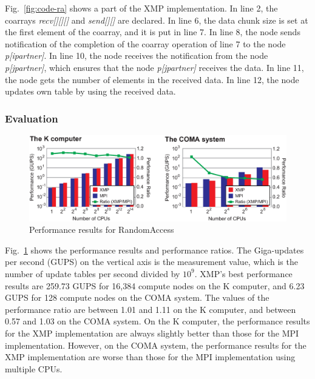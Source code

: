 \documentclass[graybox]{svmult}
\begin{document}
Fig.~\ref{fig:code-ra} shows a part of the XMP implementation.
In line 2, the coarrays {\it recv[][][]} and {\it send[][]} are declared.
In line 6, the data chunk size is set at the first element of the coarray,
and it is put in line 7.
In line 8, the node sends notification of the completion of the coarray operation of line 7 to the node {\it p[ipartner]}.
In line 10, the node receives the notification from the node {\it p[jpartner]}, which ensures that the node {\it p[jpartner]} receives the data.
In line 11, the node gets the number of elements in the received data.
In line 12, the node updates own table by using the received data.

\subsubsection{Evaluation}\label{sec:randomaccess-eva}
\begin{figure}[h]
\sidecaption
\includegraphics[scale=0.4,clip]{img/result-ra.eps}
\caption{Performance results for RandomAccess\cite{hpca}}\label{fig:result-ra}
\end{figure}

Fig.~\ref{fig:result-ra} shows the performance results and performance ratios.
The Giga-updates per second (GUPS) on the vertical axis is the measurement value, which is the number of update tables per second divided by $10^9$.
XMP's best performance results are 259.73 GUPS for 16,384 compute nodes on the K computer,
and 6.23 GUPS for 128 compute nodes on the COMA system.
The values of the performance ratio are between 1.01 and 1.11 on the K computer,
and between 0.57 and 1.03 on the COMA system.
On the K computer,
the performance results for the XMP implementation are always slightly better than those for the MPI implementation.
However, on the COMA system,
the performance results for the XMP implementation are worse than those for the MPI implementation using multiple CPUs.

\end{document}
